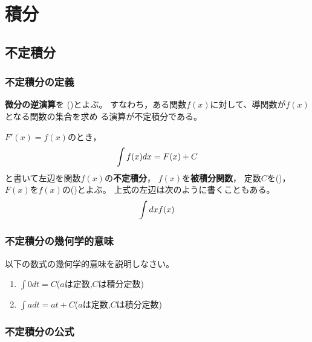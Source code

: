 \documentclass[twocolumn,11pt]{jarticle}
\begin{document}
\newpage

\section{積分}

\subsection{不定積分}

\subsubsection{不定積分の定義}
\textbf{微分の逆演算}を
()とよぶ。
すなわち，ある関数$f(x)$に対して、導関数が$f(x)$となる関数の集合を求め
る演算が不定積分である。

$F'(x)=f(x)$のとき，
\begin{align}
  \int f(x)dx=F(x)+C\notag
\end{align}
と書いて左辺を関数$f(x)$の\textbf{不定積分}，
$f(x)$を\textbf{被積分関数}，
定数$C$を()，
$F(x)$を$f(x)$の()とよぶ。
上式の左辺は次のように書くこともある。
\begin{align}
  \int dx f(x)\notag
\end{align}


\subsubsection{不定積分の幾何学的意味}
\nquestion
以下の数式の幾何学的意味を説明しなさい。
\begin{enumerate}
\item $\displaystyle\int 0 dt=C$\quad ($a$は定数,$C$は積分定数)
\item $\displaystyle\int a dt=at+C$\quad ($a$は定数,$C$は積分定数)
\end{enumerate}


\subsubsection{不定積分の公式\label{sec:integration-formula}}
\end{document}

